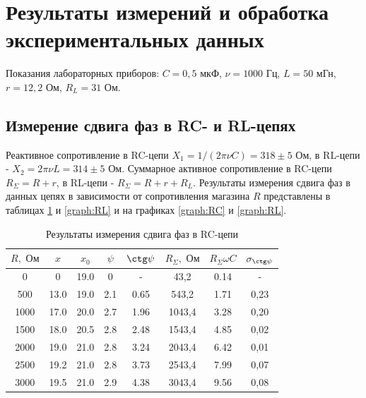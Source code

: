 \documentclass[a4paper,12pt]{article} %
\begin{document}
\section{Результаты измерений и обработка экспериментальных данных}

Показания лабораторных приборов: $C = 0,5$ мкФ, $\nu = 1000$ Гц, $L = 50$ мГн, $r = 12,2$ Ом, $R_L = 31$ Ом. 

\subsection{Измерение сдвига фаз в RC- и RL-цепях}

Реактивное сопротивление в RC-цепи $X_1 = 1/(2\pi \nu C) = 318 \pm 5$ Ом, в RL-цепи - $X_2 = 2\pi\nu L = 314 \pm 5$ Ом. Суммарное активное сопротивление в RC-цепи $R_\Sigma = R + r$, в RL-цепи - $R_\Sigma = R + r + R_L$. Результаты измерения сдвига фаз в данных цепях в зависимости от сопротивления магазина $R$ представлены в таблицах \ref{tab:RC} и \ref{graph:RL} и на графиках \ref{graph:RC} и \ref{graph:RL}.

\begin{table}
\centering
\begin{tabular}{|c|c|c|c|c|c|c|c|}
\hline
$R, \text{ Ом}$ & $x$ & $x_0$ & $\psi$ & $\ctg \psi$ & $R_{\Sigma}, \text{ Ом}$ & $R_{\Sigma} \omega C$ & $\sigma_{\ctg\psi}$\\ \hline
0&	    0&	    19.0&	    0&	    -&	    43,2&	0.14&	-\\ \hline
500&	13.0&  	19.0&	    2.1&	0.65&	543,2&	1.71&	0,23\\ \hline
1000&	17.0&	20.0&	    2.7&	1.96&	1043,4&	3.28&	0,20\\ \hline
1500&	18.0&	20.5&	    2.8&	2.48&	1543,4&	4.85&	0,02\\ \hline
2000&	19.0&  	21.0&	    2.8&	3.24&	2043,4&	6.42&	0,01\\ \hline
2500&	19.2&  	21.0&	    2.8&	3.73&	2543,4&	7.99&	0,07\\ \hline
3000&	19.5&  	21.0&   	2.9&	4.38&	3043,4&	9.56&	0,08\\ \hline
\end{tabular}
\caption{Результаты измерения сдвига фаз в RC-цепи}
\label{tab:RC}
\end{table}
\end{document}
